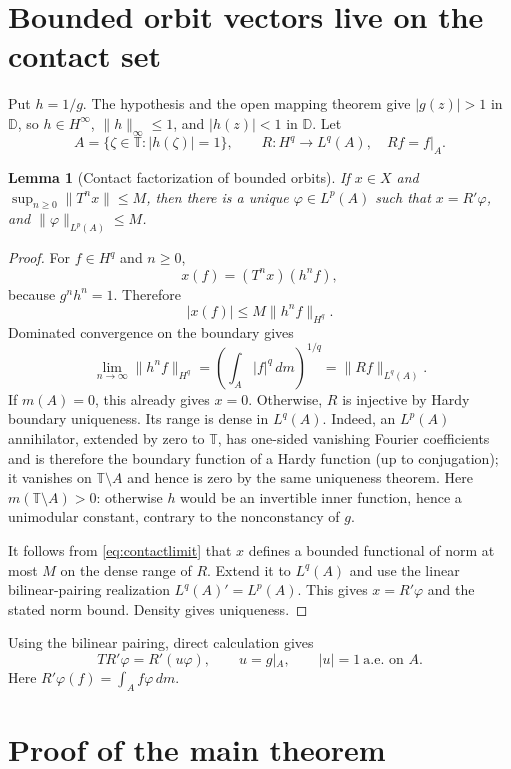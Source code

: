 \documentclass[11pt]{article}
\newtheorem{lemma}[theorem]{Lemma}
\newcommand{\D}{\mathbb D}
\newcommand{\T}{\mathbb T}
\begin{document}
\section{Bounded orbit vectors live on the contact set}

Put $h=1/g$.  The hypothesis and the open mapping theorem give
$|g(z)|>1$ in $\D$, so $h\in H^\infty$, $\|h\|_\infty\le1$, and
$|h(z)|<1$ in $\D$.  Let
\[
 A=\{\zeta\in\T:|h(\zeta)|=1\},
 \qquad R:H^q\longrightarrow L^q(A),\quad Rf=f|_A.
\]

\begin{lemma}[Contact factorization of bounded orbits]
\label{lem:factor}
If $x\in X$ and $\sup_{n\ge0}\|T^nx\|\le M$, then there is a unique
$\varphi\in L^p(A)$ such that $x=R'\varphi$, and
$\|\varphi\|_{L^p(A)}\le M$.
\end{lemma}

\begin{proof}
For $f\in H^q$ and $n\ge0$,
\[
 x(f)=(T^nx)(h^nf),
\]
because $g^nh^n=1$.  Therefore
\[
 |x(f)|\le M\|h^nf\|_{H^q}.
\]
Dominated convergence on the boundary gives
\[
 \lim_{n\to\infty}\|h^nf\|_{H^q}
 =\left(\int_A|f|^q\,dm\right)^{1/q}=\|Rf\|_{L^q(A)}.
 \tag{4.1}\label{eq:contactlimit}
\]
If $m(A)=0$, this already gives $x=0$.  Otherwise, $R$ is injective by
Hardy boundary uniqueness.  Its range is dense in $L^q(A)$.  Indeed, an
$L^p(A)$ annihilator, extended by zero to $\T$, has one-sided vanishing
Fourier coefficients and is therefore the boundary function of a Hardy
function (up to conjugation); it vanishes on $\T\setminus A$ and hence is
zero by the same uniqueness theorem.  Here $m(\T\setminus A)>0$: otherwise
$h$ would be an invertible inner function, hence a unimodular constant,
contrary to the nonconstancy of $g$.

It follows from \eqref{eq:contactlimit} that $x$ defines a bounded functional
of norm at most $M$ on the dense range of $R$.  Extend it to $L^q(A)$ and
use the linear bilinear-pairing realization $L^q(A)'=L^p(A)$.  This gives
$x=R'\varphi$ and the stated norm bound.
Density gives uniqueness.
\end{proof}

Using the bilinear pairing, direct calculation gives
\[
 T R'\varphi=R'(u\varphi),
 \qquad u=g|_A,\qquad |u|=1\ \text{a.e. on }A.
 \tag{4.2}\label{eq:contactintertwine}
\]
Here $R'\varphi(f)=\int_A f\varphi\,dm$.

\section{Proof of the main theorem}
\end{document}
